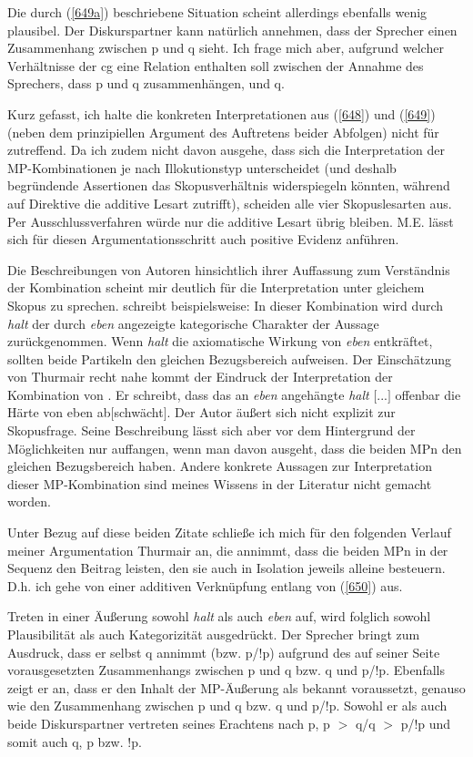 Die durch (\ref{649a}) beschriebene Situation scheint allerdings ebenfalls wenig plausibel. Der Diskurspartner kann natürlich annehmen, dass der Sprecher einen Zusammenhang zwischen p und q sieht. Ich frage mich aber, aufgrund welcher Verhältnisse der cg eine Relation enthalten soll zwischen der Annahme des Sprechers, dass p und q zusammenhängen, und q.

Kurz gefasst, ich halte die konkreten Interpretationen aus (\ref{648}) und (\ref{649}) (neben dem prinzipiellen Argument des Auftretens beider Abfolgen) nicht für zutreffend. Da ich zudem nicht davon ausgehe, dass sich die Interpretation der MP-Kombinationen je nach Illokutionstyp unterscheidet (und deshalb begründende Assertionen das Skopusverhältnis widerspiegeln könnten, während auf Direktive die additive Lesart zutrifft), scheiden alle vier Skopuslesarten aus. Per Aus\-schlussverfahren würde nur die additive Lesart übrig bleiben. M.E. lässt sich für diesen Argumentationsschritt auch  positive Evidenz anführen.

Die Beschreibungen von Autoren hinsichtlich ihrer Auffassung zum Verständnis der Kombination scheint mir deutlich für die Interpretation unter gleichem Skopus zu sprechen. \citet[257]{Thurmair1989} schreibt beispielsweise: \glqq In dieser Kombination wird durch \textit{halt} der durch \textit{eben} angezeigte kategorische Charakter der Aussage zurückgenommen.\grqq{} Wenn \textit{halt} die axiomatische Wirkung von \textit{eben} entkräftet, sollten beide Partikeln den gleichen Bezugsbereich aufweisen. Der Einschätzung von Thurmair recht nahe kommt der Eindruck der Interpretation der Kombination von \citet[226]{Dittmar2000}. Er schreibt, dass \glqq das an \textit{eben} angehängte \textit{halt} $[$...$]$ offenbar die Härte von eben ab$[$schwächt$]$\grqq{}. Der Autor äußert sich nicht explizit zur  Skopusfrage. Seine Beschreibung lässt sich aber vor dem Hintergrund der Möglichkeiten nur auffangen, wenn man davon ausgeht, dass die beiden MPn den gleichen Bezugsbereich haben. Andere konkrete Aussagen zur Interpretation dieser MP-Kombination sind meines Wissens in der Literatur nicht gemacht worden.

Unter Bezug auf diese beiden Zitate schließe ich mich für den folgenden Verlauf meiner Argumentation Thurmair an, die annimmt, dass die beiden MPn in der Sequenz den Beitrag leisten, den sie auch in Isolation jeweils alleine besteuern.  D.h. ich gehe von einer additiven Verknüpfung entlang von (\ref{650}) aus.

Treten in einer Äußerung sowohl \textit{halt} als auch \textit{eben} auf, wird folglich sowohl Plausibilität als auch Kategorizität ausgedrückt. Der Sprecher bringt zum Ausdruck, dass er selbst q annimmt (bzw. p/!p) aufgrund des auf seiner Seite vorausgesetzten Zusammenhangs zwischen p und q bzw. q und p/!p. Ebenfalls zeigt er an, dass er den Inhalt der MP-Äußerung als bekannt voraussetzt, genauso wie den Zusammenhang zwischen p und q bzw. q und p/!p. Sowohl er als auch beide Diskurspartner vertreten seines Erachtens nach p, p $>$ q/q $>$ p/!p und somit auch q, p bzw. !p. 

